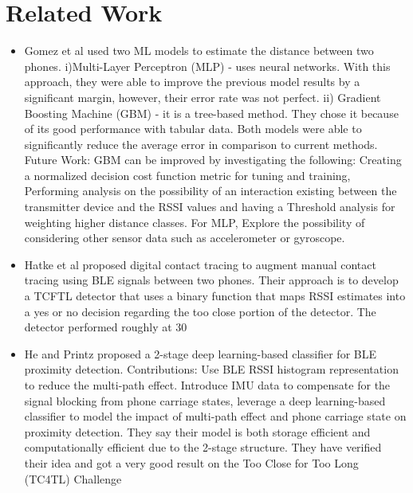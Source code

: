 \documentclass[conference]{IEEEtran}
\begin{document}
\section{Related Work}
\begin{itemize}

\item Gomez et al\cite{b2}  used two ML models to estimate the distance between two phones. i)Multi-Layer Perceptron (MLP) - uses neural networks. With this approach, they were able to improve the previous model results by a significant margin, however, their error rate was not perfect.  ii) Gradient Boosting Machine (GBM) - it is a tree-based method. They chose it because of its good performance with tabular data. Both models were able to significantly reduce the average error in comparison to current methods. Future Work: GBM can be improved by investigating the following: Creating a normalized decision cost function metric for tuning and training, Performing analysis on the possibility of an interaction existing between the transmitter device and the RSSI values and having a Threshold analysis for weighting higher distance classes. For MLP, Explore the possibility of considering other sensor data such as accelerometer or gyroscope.

\item Hatke et al\cite{b8} proposed digital contact tracing to augment manual contact tracing using BLE signals between two phones. Their approach is to develop a TCFTL detector that uses a binary function that maps RSSI estimates into a yes or no decision regarding the too close portion of the detector. The detector performed roughly at 30%

\item He and Printz\cite{b9} proposed a 2-stage deep learning-based classifier for BLE proximity detection. Contributions: Use BLE RSSI histogram representation to reduce the multi-path effect. Introduce IMU data to compensate for the signal blocking from phone carriage states, leverage a deep learning-based classifier to model the impact of multi-path effect and phone carriage state on proximity detection. They say their model is both storage efficient and computationally efficient due to the 2-stage structure. They have verified their idea and got a very good result on the Too Close for Too Long (TC4TL) Challenge\\

\end{itemize}
\end{document}
